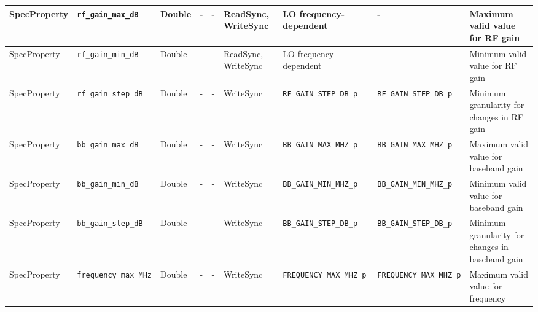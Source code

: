 \documentclass{article}
\begin{document}
\begin{landscape}
\begin{scriptsize}
\begin{longtable}{|p{1.8cm}|p{4.1cm}|p{1cm}|c|c|p{1.6cm}|p{3.7cm}|p{3.7cm}|p{2.5cm}|}
			\hline
			SpecProperty & \verb+rf_gain_max_dB+               & Double& -        & -          & ReadSync, WriteSync & LO frequency-dependent & - & Maximum valid value for RF gain                                                                                                                                                                                             \\
			\hline
			SpecProperty & \verb+rf_gain_min_dB+               & Double& -        & -          & ReadSync, WriteSync & LO frequency-dependent & - & Minimum valid value for RF gain                                                                                                                                                                                             \\
			\hline
			SpecProperty & \verb+rf_gain_step_dB+              & Double& -        & -          & WriteSync      & \verb+RF_GAIN_STEP_DB_p+ & \verb+RF_GAIN_STEP_DB_p+ & Minimum granularity for changes in RF gain                                                                                                                                                                                  \\
			\hline
			SpecProperty & \verb+bb_gain_max_dB+               & Double& -        & -          & WriteSync      & \verb+BB_GAIN_MAX_MHZ_p+ & \verb+BB_GAIN_MAX_MHZ_p+ & Maximum valid value for baseband gain                                                                                                                                                                                       \\
			\hline
			SpecProperty & \verb+bb_gain_min_dB+               & Double& -        & -          & WriteSync      & \verb+BB_GAIN_MIN_MHZ_p+ & \verb+BB_GAIN_MIN_MHZ_p+ & Minimum valid value for baseband gain                                                                                                                                                                                       \\
			\hline
			SpecProperty & \verb+bb_gain_step_dB+              & Double& -        & -          & WriteSync      & \verb+BB_GAIN_STEP_DB_p+ & \verb+BB_GAIN_STEP_DB_p+ & Minimum granularity for changes in baseband gain                                                                                                                                                                            \\
			\hline
			SpecProperty & \verb+frequency_max_MHz+            & Double& -        & -          & WriteSync      & \verb+FREQUENCY_MAX_MHZ_p+ & \verb+FREQUENCY_MAX_MHZ_p+ & Maximum valid value for frequency                                                                                                                                                                                           \\

\end{longtable}
\end{scriptsize}
\end{landscape}
\end{document}
